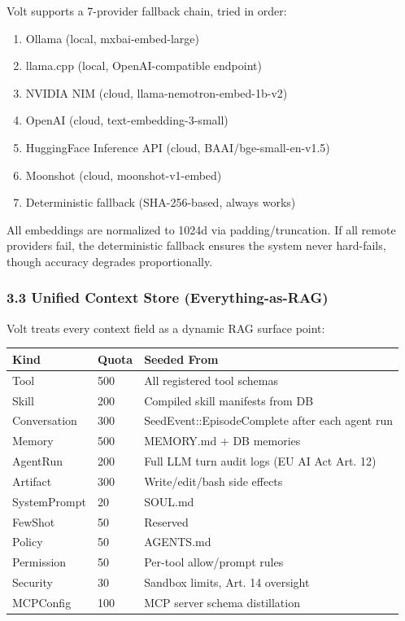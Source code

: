 \documentclass[
  10pt,
]{article}
\providecommand{\tightlist}{%
  \setlength{\itemsep}{0pt}\setlength{\parskip}{0pt}}
\begin{document}
Volt supports a 7-provider fallback chain, tried in order:

\begin{enumerate}
\def\labelenumi{\arabic{enumi}.}
\tightlist
\item
  Ollama (local, mxbai-embed-large)
\item
  llama.cpp (local, OpenAI-compatible endpoint)
\item
  NVIDIA NIM (cloud, llama-nemotron-embed-1b-v2)
\item
  OpenAI (cloud, text-embedding-3-small)
\item
  HuggingFace Inference API (cloud, BAAI/bge-small-en-v1.5)
\item
  Moonshot (cloud, moonshot-v1-embed)
\item
  Deterministic fallback (SHA-256-based, always works)
\end{enumerate}

All embeddings are normalized to 1024d via padding/truncation. If all
remote providers fail, the deterministic fallback ensures the system
never hard-fails, though accuracy degrades proportionally.

\subsubsection{3.3 Unified Context Store
(Everything-as-RAG)}\label{unified-context-store-everything-as-rag}

Volt treats every context field as a dynamic RAG surface point:

\begin{longtable}[]{@{}lll@{}}
\toprule\noalign{}
Kind & Quota & Seeded From \\
\midrule\noalign{}
\endhead
\bottomrule\noalign{}
\endlastfoot
Tool & 500 & All registered tool schemas \\
Skill & 200 & Compiled skill manifests from DB \\
Conversation & 300 & SeedEvent::EpisodeComplete after each agent run \\
Memory & 500 & MEMORY.md + DB memories \\
AgentRun & 200 & Full LLM turn audit logs (EU AI Act Art. 12) \\
Artifact & 300 & Write/edit/bash side effects \\
SystemPrompt & 20 & SOUL.md \\
FewShot & 50 & Reserved \\
Policy & 50 & AGENTS.md \\
Permission & 50 & Per-tool allow/prompt rules \\
Security & 30 & Sandbox limits, Art. 14 oversight \\
MCPConfig & 100 & MCP server schema distillation \\
\end{longtable}
\end{document}
